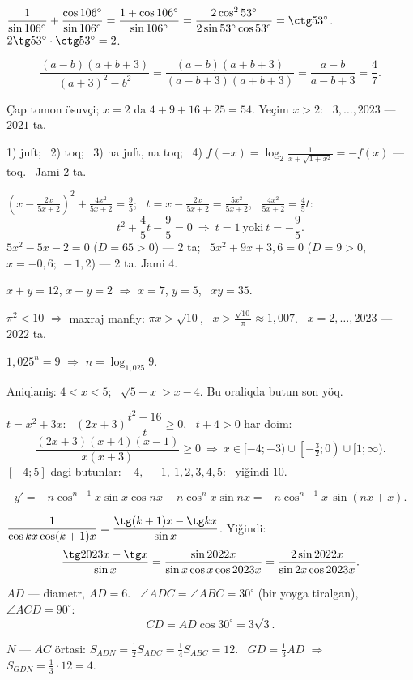 $\dfrac1{\sin106^\circ}+\dfrac{\cos106^\circ}{\sin106^\circ}=\dfrac{1+\cos106^\circ}{\sin106^\circ}=\dfrac{2\cos^253^\circ}{2\sin53^\circ\cos53^\circ}=\ctg53^\circ$.\\
$2\tg53^\circ\cdot\ctg53^\circ=2$.

\[\frac{(a-b)(a+b+3)}{(a+3)^2-b^2}=\frac{(a-b)(a+b+3)}{(a-b+3)(a+b+3)}=\frac{a-b}{a-b+3}=\frac47.\]

Çap tomon ösuvçi; $x=2$ da $4+9+16+25=54$. Yeçim $x>2$: \ $3,\dots,2023$ — $2021$ ta.

1) juft; \ 2) toq; \ 3) na juft, na toq; \ 4) $f(-x)=\log_2\frac1{x+\sqrt{1+x^2}}=-f(x)$ — toq. \ Jami $2$ ta.

$\left(x-\frac{2x}{5x+2}\right)^2+\frac{4x^2}{5x+2}=\frac95$; \ $t=x-\frac{2x}{5x+2}=\frac{5x^2}{5x+2}$, \ $\frac{4x^2}{5x+2}=\frac45t$:
\[t^2+\frac45t-\frac95=0\ \Rightarrow\ t=1\ \text{yoki}\ t=-\frac95.\]
$5x^2-5x-2=0$ ($D=65>0$) — $2$ ta; \ $5x^2+9x+3{,}6=0$ ($D=9>0$, $x=-0{,}6;\ -1{,}2$) — $2$ ta. Jami $4$.

$x+y=12$, $x-y=2$ $\Rightarrow$ $x=7$, $y=5$, \ $xy=35$.

$\pi^2<10$ $\Rightarrow$ maxraj manfiy: $\pi x>\sqrt{10}$, \ $x>\frac{\sqrt{10}}\pi\approx1{,}007$. \ $x=2,\dots,2023$ — $2022$ ta.

$1{,}025^n=9$ $\Rightarrow$ $n=\log_{1{,}025}9$.

Aniqlaniş: $4<x<5$; \ $\sqrt{5-x}>x-4$. Bu oraliqda butun son yöq.

$t=x^2+3x$: \ $(2x+3)\dfrac{t^2-16}t\ge0$, \ $t+4>0$ har doim:
\[\frac{(2x+3)(x+4)(x-1)}{x(x+3)}\ge0\ \Rightarrow\ x\in[-4;-3)\cup\left[-\tfrac32;0\right)\cup[1;\infty).\]
$[-4;5]$ dagi butunlar: $-4,\ -1,\ 1,2,3,4,5$: \ yiğindi $10$.

\[y'=-n\cos^{n-1}x\sin x\cos nx-n\cos^nx\sin nx=-n\cos^{n-1}x\,\sin(nx+x).\]

$\dfrac1{\cos kx\cos(k+1)x}=\dfrac{\tg(k+1)x-\tg kx}{\sin x}$. Yiğindi:
\[\frac{\tg2023x-\tg x}{\sin x}=\frac{\sin2022x}{\sin x\cos x\cos2023x}=\frac{2\sin2022x}{\sin2x\cos2023x}.\]

$AD$ — diametr, $AD=6$. \ $\angle ADC=\angle ABC=30^\circ$ (bir yoyga tiralgan), \ $\angle ACD=90^\circ$:
\[CD=AD\cos30^\circ=3\sqrt3.\]

$N$ — $AC$ örtasi: $S_{ADN}=\frac12S_{ADC}=\frac14S_{ABC}=12$. \ $GD=\frac13AD$ $\Rightarrow$ $S_{GDN}=\frac13\cdot12=4$.

